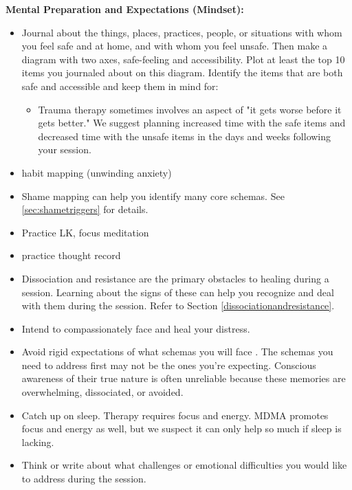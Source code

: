 \documentclass[12pt,letterpaper]{article}
\begin{document}
\noindent \textbf{Mental Preparation and Expectations (Mindset):}
\begin{itemize}
    \label{safetymapping}
    \item Journal about the things, places, practices, people, or situations with whom you feel safe and at home, and with whom you feel unsafe. Then make a diagram with two axes, safe-feeling and accessibility. Plot at least the top 10 items you journaled about on this diagram. Identify the items that are both safe and accessible and keep them in mind for:
    \begin{itemize}
        \item Trauma therapy sometimes involves an aspect of "it gets worse before it gets better." We suggest planning increased time with the safe items and decreased time with the unsafe items in the days and weeks following your session.
    \end{itemize}
    \item habit mapping (unwinding anxiety)
    \item Shame mapping can help you identify many core schemas. See \ref{sec:shametriggers} for details.
    \item Practice LK, focus meditation 
    \item practice thought record
    \item Dissociation and resistance are the primary obstacles to healing during a session. Learning about the signs of these can help you recognize and deal with them during the session. Refer to Section \ref{dissociationandresistance}.
    \item Intend to compassionately face and heal your distress. 
    \item Avoid rigid expectations of what schemas you will face \cite{mithoeferManual}. The schemas you need to address first may not be the ones you're expecting. Conscious awareness of their true nature is often unreliable because these memories are overwhelming, dissociated, or avoided.
    \item Catch up on sleep. Therapy requires focus and energy. MDMA promotes focus and energy as well, but we suspect it can only help so much if sleep is lacking.
    \item Think or write about what challenges or emotional difficulties you would like to address during the session.
\end{itemize}
\end{document}
